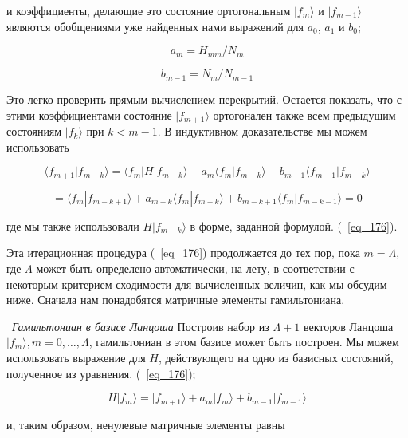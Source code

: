 \documentclass[11pt]{article}
\begin{document}
и коэффициенты, делающие это состояние ортогональным $| f_m \rangle$ и $| f_{m − 1}  \rangle $ являются обобщениями уже найденных нами выражений для $a_0$, $a_1$ и $b_0$;

\begin{equation}
a_m = H_{mm}/N_m
\label{eq_177}
\end{equation}

\begin{equation*}
b_{m-1} = N_m/N_{m-1}
\end{equation*}

Это легко проверить прямым вычислением перекрытий. Остается показать, что с этими коэффициентами состояние $| f_{m + 1} \rangle$ ортогонален также всем предыдущим состояниям $| f_k \rangle $ при $k <m - 1$. В индуктивном доказательстве мы можем использовать

\begin{equation*}
\langle f_{m+1}|f_{m-k}\rangle = \langle f_m | H | f_{m-k} \rangle 
- a_m \langle f_m | f_{m-k} \rangle
- b_{m-1} \langle f_{m-1} | f_{m-k} \rangle 
\end{equation*}

\begin{equation}
= \langle f_m | f_{m-k+1} \rangle
+ a_{m-k} \langle f_m | f_{m-k} \rangle
+ b_{m-k+1} \langle f_{m} | f_{m-k-1} \rangle = 0
\label{eq_178}
\end{equation}

где мы также использовали $H | f_{m − k} \rangle$ в форме, заданной формулой. (~\ref{eq_176}).

Эта итерационная процедура (~\ref{eq_176}) продолжается до тех пор, пока $m = \Lambda$, где $\Lambda$ может быть определено автоматически, на лету, в соответствии с некоторым критерием сходимости для вычисленных величин, как мы обсудим ниже. Сначала нам понадобятся матричные элементы гамильтониана.

~\emph{Гамильтониан в базисе Ланцоша}
Построив набор из $\Lambda + 1$ векторов Ланцоша $| f_m \rangle, m = 0,\dots , \Lambda $, гамильтониан в этом базисе может быть построен. Мы можем использовать выражение для $H$, действующего на одно из базисных состояний, полученное из уравнения. (~\ref{eq_176});


\begin{equation}
H|f_m \rangle = |f_{m+1} \rangle + a_m |f_m \rangle + b_{m-1} |f_{m-1} \rangle
\label{eq_179}
\end{equation}

и, таким образом, ненулевые матричные элементы равны
\end{document}

